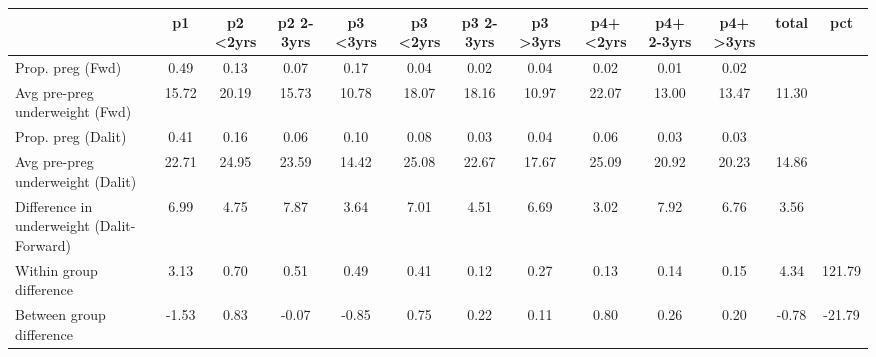 \begin{tabular}{l*{12}{c}}
\toprule
            &\multicolumn{1}{c}{p1}&\multicolumn{1}{c}{p2 \textless2yrs}&\multicolumn{1}{c}{p2 2-3yrs}&\multicolumn{1}{c}{p3 \textless3yrs}&\multicolumn{1}{c}{p3 <2yrs}&\multicolumn{1}{c}{p3 2-3yrs}&\multicolumn{1}{c}{p3 >3yrs}&\multicolumn{1}{c}{p4+ <2yrs}&\multicolumn{1}{c}{p4+ 2-3yrs}&\multicolumn{1}{c}{p4+ >3yrs}&\multicolumn{1}{c}{total}&\multicolumn{1}{c}{pct}\\
\midrule
\midrule
Prop. preg (Fwd)&        0.49&        0.13&        0.07&        0.17&        0.04&        0.02&        0.04&        0.02&        0.01&        0.02&            &            \\
Avg pre-preg underweight (Fwd)&       15.72&       20.19&       15.73&       10.78&       18.07&       18.16&       10.97&       22.07&       13.00&       13.47&       11.30&            \\
Prop. preg (Dalit)&        0.41&        0.16&        0.06&        0.10&        0.08&        0.03&        0.04&        0.06&        0.03&        0.03&            &            \\
Avg pre-preg underweight (Dalit)&       22.71&       24.95&       23.59&       14.42&       25.08&       22.67&       17.67&       25.09&       20.92&       20.23&       14.86&            \\
Difference in underweight (Dalit-Forward)&        6.99&        4.75&        7.87&        3.64&        7.01&        4.51&        6.69&        3.02&        7.92&        6.76&        3.56&            \\
Within group difference&        3.13&        0.70&        0.51&        0.49&        0.41&        0.12&        0.27&        0.13&        0.14&        0.15&        4.34&      121.79\\
Between group difference&       -1.53&        0.83&       -0.07&       -0.85&        0.75&        0.22&        0.11&        0.80&        0.26&        0.20&       -0.78&      -21.79\\
\bottomrule
\end{tabular}
